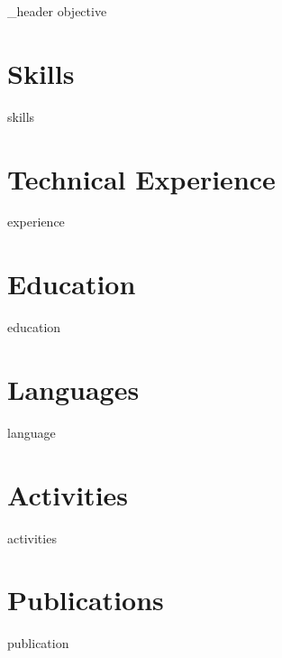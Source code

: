 \documentclass[letter,10pt]{article}
\author{Quang Nguyen} %
\begin{document}
{_header}
{objective}

\section{Skills}
{skills}

\section{Technical Experience}
{experience}

\section{Education}
{education}

\section{Languages}
{language}

\section{Activities}
{activities}

\section{Publications}
{publication}
\end{document}
